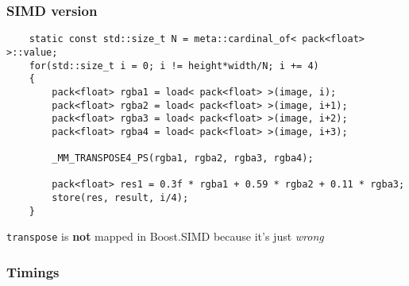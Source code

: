 \begin{frame}[fragile]
	\frametitle{SIMD version}
	
	\begin{lstlisting}
	static const std::size_t N = meta::cardinal_of< pack<float> >::value;
	for(std::size_t i = 0; i != height*width/N; i += 4)
	{
	    pack<float> rgba1 = load< pack<float> >(image, i);
	    pack<float> rgba2 = load< pack<float> >(image, i+1);
	    pack<float> rgba3 = load< pack<float> >(image, i+2);
	    pack<float> rgba4 = load< pack<float> >(image, i+3);
	    
	    _MM_TRANSPOSE4_PS(rgba1, rgba2, rgba3, rgba4);		
	    
	    pack<float> res1 = 0.3f * rgba1 + 0.59 * rgba2 + 0.11 * rgba3;
	    store(res, result, i/4); 
	}
	\end{lstlisting}
	\bigskip
	
	\lstinline{transpose} is \textbf{not} mapped in Boost.SIMD because it's just \textit{wrong}
\end{frame}

\begin{frame}
	\frametitle{Timings}
\end{frame}

